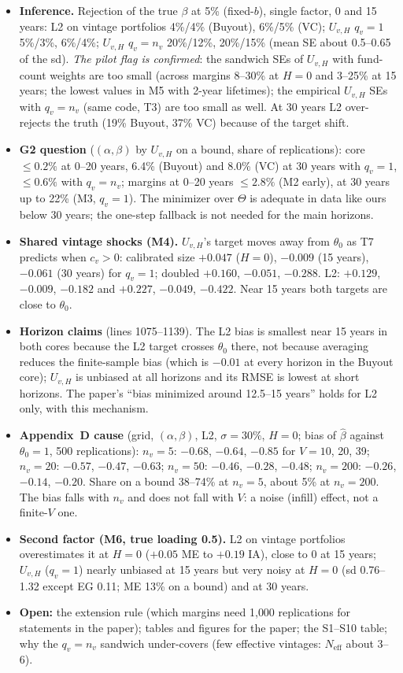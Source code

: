 \documentclass[11pt]{article}
\begin{document}
\begin{itemize}
\item \textbf{Inference.} Rejection of the true $\beta$ at 5\% (fixed-$b$), single factor, 0 and 15 years: L2 on vintage portfolios 4\%/4\% (Buyout), 6\%/5\% (VC); $U_{v,H}$ $q_v=1$ 5\%/3\%, 6\%/4\%; $U_{v,H}$ $q_v=n_v$ 20\%/12\%, 20\%/15\% (mean SE about 0.5--0.65 of the sd). \emph{The pilot flag is confirmed}: the sandwich SEs of $U_{v,H}$ with fund-count weights are too small (across margins 8--30\% at $H=0$ and 3--25\% at 15 years; the lowest values in M5 with 2-year lifetimes); the empirical $U_{v,H}$ SEs with $q_v=n_v$ (same code, T3) are too small as well. At 30 years L2 over-rejects the truth (19\% Buyout, 37\% VC) because of the target shift.
\item \textbf{G2 question} ($(\alpha,\beta)$ by $U_{v,H}$ on a bound, share of replications): core $\le0.2\%$ at 0--20 years, 6.4\% (Buyout) and 8.0\% (VC) at 30 years with $q_v=1$, $\le0.6\%$ with $q_v=n_v$; margins at 0--20 years $\le2.8\%$ (M2 early), at 30 years up to 22\% (M3, $q_v=1$). The minimizer over $\Theta$ is adequate in data like ours below 30 years; the one-step fallback is not needed for the main horizons.
\item \textbf{Shared vintage shocks (M4).} $U_{v,H}$'s target moves away from $\theta_0$ as T7 predicts when $c_v>0$: calibrated size $+0.047$ ($H=0$), $-0.009$ (15 years), $-0.061$ (30 years) for $q_v=1$; doubled $+0.160$, $-0.051$, $-0.288$. L2: $+0.129$, $-0.009$, $-0.182$ and $+0.227$, $-0.049$, $-0.422$. Near 15 years both targets are close to $\theta_0$.
\item \textbf{Horizon claims} (lines 1075--1139). The L2 bias is smallest near 15 years in both cores because the L2 target crosses $\theta_0$ there, not because averaging reduces the finite-sample bias (which is $-0.01$ at every horizon in the Buyout core); $U_{v,H}$ is unbiased at all horizons and its RMSE is lowest at short horizons. The paper's ``bias minimized around 12.5--15 years'' holds for L2 only, with this mechanism.
\item \textbf{Appendix~D cause} (grid, $(\alpha,\beta)$, L2, $\sigma=30\%$, $H=0$; bias of $\hat\beta$ against $\theta_0=1$, 500 replications): $n_v=5$: $-0.68$, $-0.64$, $-0.85$ for $V=10$, 20, 39; $n_v=20$: $-0.57$, $-0.47$, $-0.63$; $n_v=50$: $-0.46$, $-0.28$, $-0.48$; $n_v=200$: $-0.26$, $-0.14$, $-0.20$. Share on a bound 38--74\% at $n_v=5$, about 5\% at $n_v=200$. The bias falls with $n_v$ and does not fall with $V$: a noise (infill) effect, not a finite-$V$ one.
\item \textbf{Second factor (M6, true loading 0.5).} L2 on vintage portfolios overestimates it at $H=0$ ($+0.05$ ME to $+0.19$ IA), close to 0 at 15 years; $U_{v,H}$ ($q_v=1$) nearly unbiased at 15 years but very noisy at $H=0$ (sd 0.76--1.32 except EG 0.11; ME 13\% on a bound) and at 30 years.
\item \textbf{Open:} the extension rule (which margins need 1{,}000 replications for statements in the paper); tables and figures for the paper; the S1--S10 table; why the $q_v=n_v$ sandwich under-covers (few effective vintages: $N_{\mathrm{eff}}$ about 3--6).
\end{itemize}
\end{document}
